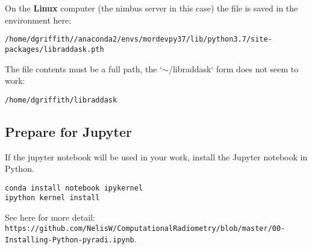 On the \textbf{Linux} computer (the nimbus server in this case)  the file is saved in the environment here: 
\begin{lstlisting}
/home/dgriffith//anaconda2/envs/mordevpy37/lib/python3.7/site-packages/libraddask.pth
\end{lstlisting}
The file contents must be a full path, the `$\sim$/libraddask` form does not seem to work:
\begin{lstlisting}
/home/dgriffith/libraddask
\end{lstlisting}

\subsection{Prepare for Jupyter}
If the jupyter notebook will be used in your work,  install the Jupyter notebook in Python.
\begin{lstlisting}
conda install notebook ipykernel
ipython kernel install
\end{lstlisting}
See here for more detail:\\
\lstinline{https://github.com/NelisW/ComputationalRadiometry/blob/master/00-Installing-Python-pyradi.ipynb}.

